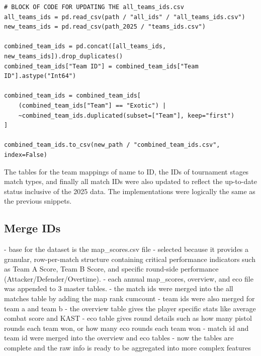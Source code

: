 \begin{lstlisting}[style=code]
# BLOCK OF CODE FOR UPDATING THE all_teams_ids.csv
all_teams_ids = pd.read_csv(path / "all_ids" / "all_teams_ids.csv")
new_teams_ids = pd.read_csv(path_2025 / "teams_ids.csv")

combined_team_ids = pd.concat([all_teams_ids, new_teams_ids]).drop_duplicates()
combined_team_ids["Team ID"] = combined_team_ids["Team ID"].astype("Int64")

combined_team_ids = combined_team_ids[
    (combined_team_ids["Team"] == "Exotic") | 
    ~combined_team_ids.duplicated(subset=["Team"], keep="first")
]

combined_team_ids.to_csv(new_path / "combined_team_ids.csv", index=False)
\end{lstlisting}

The tables for the team mappings of name to ID, the IDs of tournament stages match types, and finally all match IDs were also updated to reflect the up-to-date status inclusive of the 2025 data. The implementations were logically the same as the previous snippets.

\subsection{Merge IDs}
- base for the dataset is the map\_scores.csv file
- selected because it provides a granular, row-per-match structure containing critical performance indicators such as Team A Score, Team B Score, and specific round-side performance (Attacker/Defender/Overtime). 
- each annual map\_scores, overview, and eco file was appended to 3 master tables.
- the match ids were merged into the all matches table by adding the map rank cumcount
- team ids were also merged for team a and team b
- the overview table gives the player specific stats like average combat score and KAST
- eco table gives round details such as how many pistol rounds each team won, or how many eco rounds each team won 
- match id and team id were merged into the overview and eco tables
- now the tables are complete and the raw info is ready to be aggregated into more complex features

